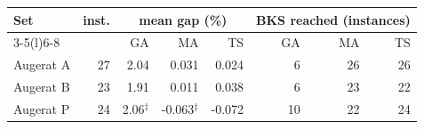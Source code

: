 \begin{tabular}{@{}l r r r r r r r@{}}
\toprule
Set & inst. & \multicolumn{3}{c}{mean gap (\%)} & \multicolumn{3}{c}{BKS reached (instances)} \\
\cmidrule(lr){3-5}\cmidrule(l){6-8}
 & & GA & MA & TS & GA & MA & TS \\
\midrule
Augerat A & 27 & 2.04 & 0.031 & 0.024 & 6 & 26 & 26 \\
Augerat B & 23 & 1.91 & 0.011 & 0.038 & 6 & 23 & 22 \\
Augerat P & 24 & 2.06$^\ddagger$ & -0.063$^\ddagger$ & -0.072 & 10 & 22 & 24 \\
\bottomrule
\end{tabular}
